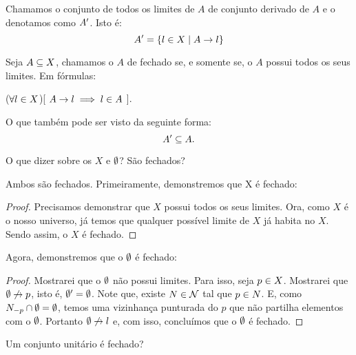 \documentclass[a4paper,12pt,oneside]{book}
\begin{document}
\begin{definition}
	\label{def:derivado}
	Chamamos o conjunto de todos os limites de $A$ de conjunto derivado de $A$ e o denotamos como $A^{\prime}$. Isto é:
	\[
		A^{\prime} = \left\{ l \in X \mid A \rightarrow l\right\}
	\]
\end{definition}

\begin{definition}[Fechado]
	\label{def:fechado}
	Seja $A \subseteq X$, chamamos o $A$ de fechado se, e somente se, o $A$ possui todos os seus limites. Em fórmulas:
	\begin{center}
		($\forall l \in X$)[ $A \rightarrow l \implies l \in A$ ].
	\end{center}
	O que também pode ser visto da seguinte forma:
	\[
		A^{\prime} \subseteq A.
	\]
\end{definition}

\begin{question}
	\label{universo-fechado}
	\label{vazio-fechado}
	O que dizer sobre os $X$ e $\emptyset$? São fechados?
\end{question}

\begin{answer}
	Ambos são fechados. Primeiramente, demonstremos que X é fechado:
	\begin{proof}
		Precisamos demonstrar que $X$ possui todos os seus limites. Ora, como $X$ é o nosso universo, já temos que qualquer possível limite de $X$ já habita no $X$. Sendo assim, o $X$ é fechado.
	\end{proof}
	Agora, demonstremos que o $\emptyset$ é fechado:
	\begin{proof}
		Mostrarei que o $\emptyset$ não possui limites. Para isso, seja $p \in X$. Mostrarei que $\emptyset \not\rightarrow p$, isto é, $\emptyset^{\prime} = \emptyset$. Note que, existe $N \in \mathcal{N}$ tal que $p \in N$. E, como $N_{-p} \cap \emptyset = \emptyset$, temos uma vizinhança punturada do $p$ que não partilha  elementos com o $\emptyset$. Portanto $\emptyset \not\rightarrow l$ e, com isso, concluímos que o $\emptyset$ é fechado.
	\end{proof}
\end{answer}

\begin{question}
	Um conjunto unitário é fechado?
\end{question}
\end{document}
